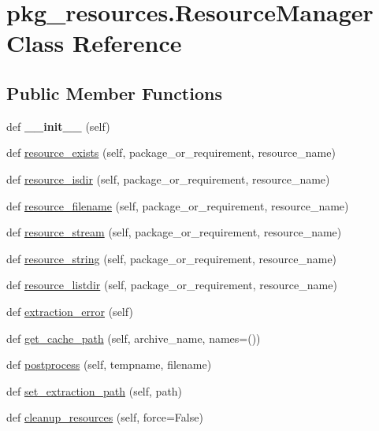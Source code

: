 \hypertarget{classpkg__resources_1_1_resource_manager}{}\section{pkg\+\_\+resources.\+Resource\+Manager Class Reference}
\label{classpkg__resources_1_1_resource_manager}
\subsection*{Public Member Functions}
\begin{DoxyCompactItemize}
\item 
\mbox{\label{classpkg__resources_1_1_resource_manager_a9673742b6f33a0e9e50964d778d88147}} 
def {\bfseries \+\_\+\+\_\+init\+\_\+\+\_\+} (self)
\item 
def \hyperlink{classpkg__resources_1_1_resource_manager_ad1b6e05f2dbd4022e832ce0fce52a49c}{resource\+\_\+exists} (self, package\+\_\+or\+\_\+requirement, resource\+\_\+name)
\item 
def \hyperlink{classpkg__resources_1_1_resource_manager_a32204e72f09b8a5f92e50d8ef1636bc6}{resource\+\_\+isdir} (self, package\+\_\+or\+\_\+requirement, resource\+\_\+name)
\item 
def \hyperlink{classpkg__resources_1_1_resource_manager_a6c85868c8de9cb637490e298ff1252c0}{resource\+\_\+filename} (self, package\+\_\+or\+\_\+requirement, resource\+\_\+name)
\item 
def \hyperlink{classpkg__resources_1_1_resource_manager_a8656d0d38efd4f2afe70595e001838fc}{resource\+\_\+stream} (self, package\+\_\+or\+\_\+requirement, resource\+\_\+name)
\item 
def \hyperlink{classpkg__resources_1_1_resource_manager_ae1e5f9bafec64d9271aea875f7d491bf}{resource\+\_\+string} (self, package\+\_\+or\+\_\+requirement, resource\+\_\+name)
\item 
def \hyperlink{classpkg__resources_1_1_resource_manager_aa613cb6baad8c9bdb748e6592536022d}{resource\+\_\+listdir} (self, package\+\_\+or\+\_\+requirement, resource\+\_\+name)
\item 
def \hyperlink{classpkg__resources_1_1_resource_manager_a39f27f35ad11069273856a00d26df314}{extraction\+\_\+error} (self)
\item 
def \hyperlink{classpkg__resources_1_1_resource_manager_a79de123f8cc5bf426ae33bd6b6b21e0c}{get\+\_\+cache\+\_\+path} (self, archive\+\_\+name, names=())
\item 
def \hyperlink{classpkg__resources_1_1_resource_manager_af459cd9904c680589c54e462b0e6cf4d}{postprocess} (self, tempname, filename)
\item 
def \hyperlink{classpkg__resources_1_1_resource_manager_aa07a3bbaed612c6837984c00c8d162eb}{set\+\_\+extraction\+\_\+path} (self, path)
\item 
def \hyperlink{classpkg__resources_1_1_resource_manager_a85ba051ec7d82f0803dd96e45df1d21d}{cleanup\+\_\+resources} (self, force=False)
\end{DoxyCompactItemize}
